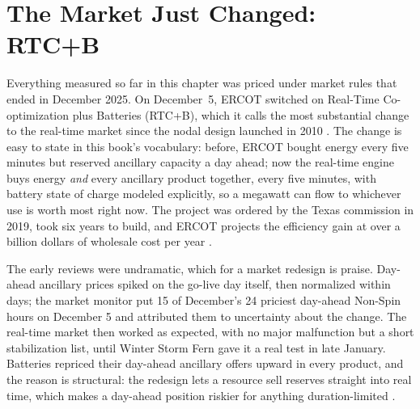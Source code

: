 \section{The Market Just Changed: RTC+B}
\label{sec:rtcb-firstlook}

Everything measured so far in this chapter was priced under market rules that ended in December 2025. On December~5, ERCOT switched on Real-Time Co-optimization plus Batteries (RTC+B), which it calls the most substantial change to the real-time market since the nodal design launched in 2010 \autocite{ercot2025rtcblive}. %
The change is easy to state in this book's vocabulary: before, ERCOT bought energy every five minutes but reserved ancillary capacity a day ahead; now the real-time engine buys energy \emph{and} every ancillary product together, every five minutes, with battery state of charge modeled explicitly, so a megawatt can flow to whichever use is worth most right now. %
The project was ordered by the Texas commission in 2019, took six years to build, and ERCOT projects the efficiency gain at over a billion dollars of wholesale cost per year \autocite{ercot2025rtcblive}. %

The early reviews were undramatic, which for a market redesign is praise. Day-ahead ancillary prices spiked on the go-live day itself, then normalized within days; the market monitor put 15 of December's 24 priciest day-ahead Non-Spin hours on December 5 and attributed them to uncertainty about the change. The real-time market then worked as expected, with no major malfunction but a short stabilization list, until Winter Storm Fern gave it a real test in late January. Batteries repriced their day-ahead ancillary offers upward in every product, and the reason is structural: the redesign lets a resource sell reserves straight into real time, which makes a day-ahead position riskier for anything duration-limited \autocite{potomac2026somercot,ercotcmu2026feb}. %

